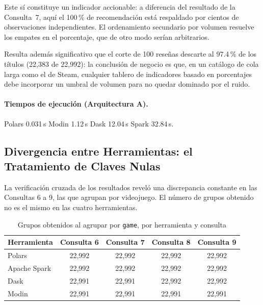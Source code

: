 Este sí constituye un indicador accionable: a diferencia del resultado de la Consulta~7, aquí el 100\,\% de recomendación está respaldado por cientos de observaciones independientes. El ordenamiento secundario por volumen resuelve los empates en el porcentaje, que de otro modo serían arbitrarios.

Resulta además significativo que el corte de 100 reseñas descarte al 97.4\,\% de los títulos (22,383 de 22,992): la conclusión de negocio es que, en un catálogo de cola larga como el de Steam, cualquier tablero de indicadores basado en porcentajes debe incorporar un umbral de volumen para no quedar dominado por el ruido.

\paragraph{Tiempos de ejecución (Arquitectura A).}
Polars 0.031\,s \textbar{} Modin 1.12\,s \textbar{} Dask 12.04\,s \textbar{} Spark 32.84\,s.



\subsection{Divergencia entre Herramientas: el Tratamiento de Claves Nulas}
\label{subsec:divergencia}

La verificación cruzada de los resultados reveló una discrepancia constante en las Consultas 6 a 9, las que agrupan por videojuego. El número de grupos obtenido no es el mismo en las cuatro herramientas.

\begin{table}[H]
\centering
\caption{Grupos obtenidos al agrupar por \texttt{game}, por herramienta y consulta}
\label{tab:divergencia}
\vspace{0.2cm}
\small
\begin{tabular}{@{}lcccc@{}}
\toprule
\textbf{Herramienta} & \textbf{Consulta 6} & \textbf{Consulta 7} & \textbf{Consulta 8} & \textbf{Consulta 9} \\
\midrule
Polars        & 22,992 & 22,992 & 22,992 & 22,992 \\
Apache Spark  & 22,992 & 22,992 & 22,992 & 22,992 \\
Dask          & 22,991 & 22,991 & 22,992 & 22,992 \\
Modin         & 22,991 & 22,991 & 22,991 & 22,991 \\
\bottomrule
\end{tabular}
\end{table}

